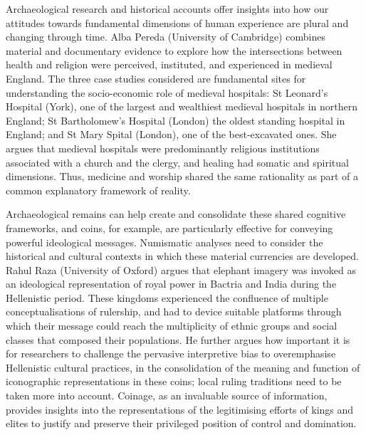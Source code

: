 Archaeological research and historical accounts offer insights into how our attitudes towards fundamental dimensions of human experience are plural and changing through time. Alba Pereda (University of Cambridge) combines material and documentary evidence to explore how the intersections between health and religion were perceived, instituted, and experienced in medieval England. The three case studies considered are fundamental sites for understanding the socio-economic role of medieval hospitals: St Leonard’s Hospital (York), one of the largest and wealthiest medieval hospitals in northern England; St Bartholomew’s Hospital (London) the oldest standing hospital in England; and St Mary Spital (London), one of the best-excavated ones. She argues that medieval hospitals were predominantly religious institutions associated with a church and the clergy, and healing had somatic and spiritual dimensions. Thus, medicine and worship shared the same rationality as part of a common explanatory framework of reality.

Archaeological remains can help create and consolidate these shared cognitive frameworks, and coins, for example, are particularly effective for conveying powerful ideological messages. Numismatic analyses need to consider the historical and cultural contexts in which these material currencies are developed. Rahul Raza (University of Oxford) argues that elephant imagery was invoked as an ideological representation of royal power in Bactria and India during the Hellenistic period. These kingdoms experienced the confluence of multiple conceptualisations of rulership, and had to device suitable platforms through which their message could reach the multiplicity of ethnic groups and social classes that composed their populations. He further argues how important it is for researchers to challenge the pervasive interpretive bias to overemphasise Hellenistic cultural practices, in the consolidation of the meaning and function of iconographic representations in these coins; local ruling traditions need to be taken more into account. Coinage, as an invaluable source of information, provides insights into the representations of the legitimising efforts of kings and elites to justify and preserve their privileged position of control and domination. 

